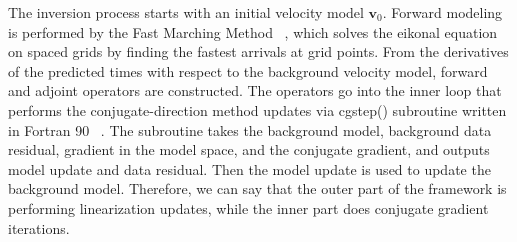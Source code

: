 The inversion process starts with an initial velocity model $\mathbf{v}_0$. Forward modeling is performed by the Fast Marching Method ~\cite{s:96}, which solves the eikonal equation on spaced grids by finding the fastest arrivals at grid points. From the derivatives of the predicted times with respect to the background velocity model, forward and adjoint operators are constructed. The operators go into the inner loop that performs the conjugate-direction method updates via cgstep() subroutine written in Fortran 90 ~\cite{c:14}. The subroutine takes the background model, background data residual, gradient in the model space, and the conjugate gradient, and outputs model update and data residual. Then the model update is used to update the background model. Therefore, we can say that the outer part of the framework is performing linearization updates, while the inner part does conjugate gradient iterations.


  
